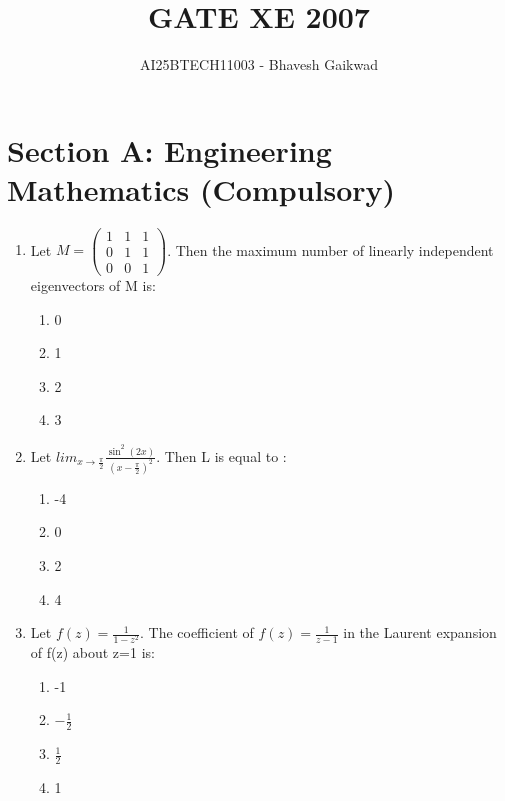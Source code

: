 \documentclass[journal,cmex10]{IEEEtran}
\theoremstyle{remark}
\newcommand{\myvec}[1]{\ensuremath{\begin{pmatrix}#1\end{pmatrix}}}
\numberwithin{equation}{enumi}
\numberwithin{figure}{enumi}
\begin{document}

\vspace{3cm}

\title{GATE XE 2007}
\author{AI25BTECH11003 - Bhavesh Gaikwad}
{\let\newpage\relax\maketitle}

\section*{Section A: Engineering Mathematics (Compulsory)}
\vspace{2\baselineskip}
\begin{enumerate}[label=\arabic*)]

    \item Let $M =\myvec{ 1 & 1 & 1 \\ 0 & 1 &1 \\ 0 & 0 &1}$. Then the maximum number of linearly independent eigenvectors of M is:
    \vspace{0.3cm}
    \hfill{}
    \begin{enumerate}[label=\alph*)]
        \item 0
        \item 1
        \item 2
        \item 3
    \end{enumerate}
    \bigskip

    \item Let $ lim_{x \to \frac{\pi}{2}} \frac{\sin^{2}(2x)}{\left(x - \frac{\pi}{2}\right)^{2}} $. Then L is equal to :
    \vspace{0.2cm}
    \hfill {}
    \begin{enumerate}[label=\alph*)]
        \item -4
        \item 0
        \item 2
        \item 4
    \end{enumerate}
    \bigskip

    \item Let $ f(z) = \frac{1}{1 - z^{2}} $. The coefficient of  $ f(z) = \frac{1}{z-1} $ in the Laurent expansion of f(z) about z=1 is:
    \vspace{0.3cm}
    \hfill {}
    \begin{enumerate}[label=\alph*)]
        \item -1
        \item $-\frac{1}{2}$
        \item $\frac{1}{2}$
        \item 1
    \end{enumerate}
    \vspace{0.2cm}


\end{enumerate}
\end{document}
